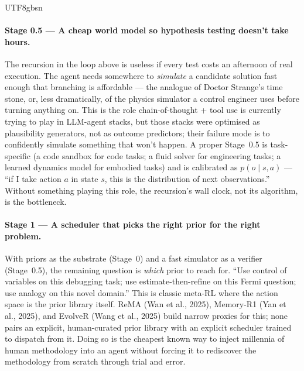\documentclass{article}
\begin{document}
\begin{CJK*}{UTF8}{gbsn}
\paragraph{Stage 0.5 --- A cheap world model so hypothesis
testing doesn't take hours.} The recursion in the loop above is
useless if every test costs an afternoon of real execution. The
agent needs somewhere to \emph{simulate} a candidate solution
fast enough that branching is affordable --- the analogue of
Doctor Strange's time stone, or, less dramatically, of the
physics simulator a control engineer uses before turning anything
on. This is the role chain-of-thought + tool use is currently
trying to play in LLM-agent stacks, but those stacks were
optimised as plausibility generators, not as outcome predictors;
their failure mode is to confidently simulate something that
won't happen. A proper Stage~0.5 is task-specific (a code
sandbox for code tasks; a fluid solver for engineering tasks; a
learned dynamics model for embodied tasks) and is calibrated as
\(p(o \mid s, a)\) --- ``if I take action \(a\) in state \(s\),
this is the distribution of next observations.'' Without
something playing this role, the recursion's wall clock, not its
algorithm, is the bottleneck.

\paragraph{Stage 1 --- A scheduler that picks the right prior
for the right problem.} With priors as the substrate (Stage~0)
and a fast simulator as a verifier (Stage~0.5), the remaining
question is \emph{which} prior to reach for. ``Use control of
variables on this debugging task; use estimate-then-refine on
this Fermi question; use analogy on this novel domain.'' This is
classic meta-RL where the action space is the prior library
itself. ReMA (Wan et al., 2025), Memory-R1
(Yan et al., 2025), and EvolveR (Wang et al., 2025) build
narrow proxies for this; none pairs an explicit, human-curated
prior library with an explicit scheduler trained to dispatch from
it. Doing so is the cheapest known way to inject millennia of
human methodology into an agent without forcing it to rediscover
the methodology from scratch through trial and error.


\end{CJK*}
\end{document}
